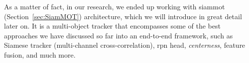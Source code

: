 As a matter of fact, in our research, we ended up working with \gls{siammot}~\cite{shuai2021siammot} (Section~\ref{sec:SiamMOT}) architecture, which we will introduce in great detail later on. It is a multi-object tracker that encompasses some of the best approaches we have discussed so far into an end-to-end framework, such as Siamese tracker (multi-channel cross-correlation), \gls{rpn} head, \emph{centerness}, feature fusion, and much more.
